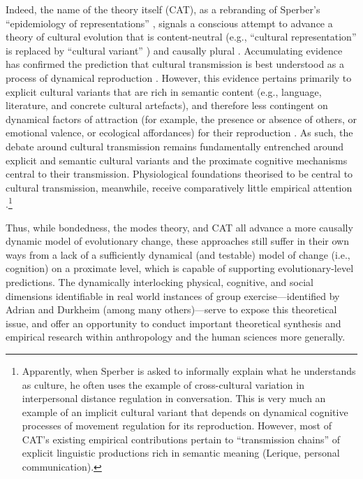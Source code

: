 \begin{CJK}{UTF8}{gbsn}
Indeed, the name of the theory itself (CAT), as a rebranding of Sperber's ``epidemiology of representations'' \citep{Sperber1996}, signals a conscious attempt to advance a theory of cultural evolution that is content-neutral (e.g., ``cultural representation'' is replaced by ``cultural variant'' \citep{Scott-Phillips2018}) and causally plural \citep{Claidiere2014}.  Accumulating evidence has confirmed the prediction that cultural transmission is best understood as a process of dynamical reproduction \citep[rather than strict preservative copying, see][]{Morin2016,Scott-Phillips2017}.  However, this evidence pertains primarily to explicit cultural variants that are rich in semantic content (e.g., language, literature, and concrete cultural artefacts), and therefore less contingent on dynamical factors of attraction (for example, the presence or absence of others, or emotional valence, or ecological affordances) for their reproduction \citep[15]{Ramstead2016}.  As such, the debate around cultural transmission remains fundamentally entrenched around explicit and semantic cultural variants and the proximate cognitive mechanisms central to their transmission.  Physiological foundations theorised to be central to cultural transmission, meanwhile, receive comparatively little empirical attention \citep{Ramstead2016,Lerique2016}.\footnote{Apparently, when Sperber is asked to informally explain what he understands as culture, he often uses the example of cross-cultural variation in interpersonal distance regulation in conversation.  This is very much an example of an implicit cultural variant that depends on dynamical cognitive processes of movement regulation for its reproduction.  However, most of CAT's existing empirical contributions pertain to ``transmission chains'' of explicit linguistic productions rich in semantic meaning (Lerique, personal communication).}

Thus, while bondedness, the modes theory, and CAT all advance a more causally dynamic model of evolutionary change, these approaches still suffer in their own ways from a lack of a sufficiently dynamical (and testable) model of change (i.e., cognition) on a proximate level, which is capable of supporting evolutionary-level predictions.  The dynamically interlocking physical, cognitive, and social dimensions identifiable in real world instances of group exercise---identified by Adrian and Durkheim (among many others)---serve to expose this theoretical issue, and offer an opportunity to conduct important theoretical synthesis and empirical research within anthropology and the human sciences more generally.


\end{CJK}
